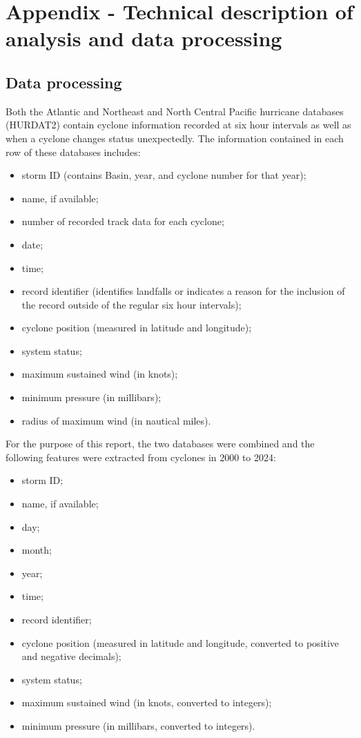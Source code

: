 \documentclass[
]{article}
\providecommand{\tightlist}{%
  \setlength{\itemsep}{0pt}\setlength{\parskip}{0pt}}
\begin{document}
\newpage

\section{Appendix - Technical description of analysis and data processing}\label{appendix---technical-description-of-analysis-and-data-processing}

\subsection{Data processing}\label{data-processing}

Both the Atlantic and Northeast and North Central Pacific hurricane databases (HURDAT2) contain cyclone information recorded at six hour intervals as well as when a cyclone changes status unexpectedly. The information contained in each row of these databases includes:

\begin{itemize}
\tightlist
\item
  storm ID (contains Basin, year, and cyclone number for that year);
\item
  name, if available;
\item
  number of recorded track data for each cyclone;
\item
  date;
\item
  time;
\item
  record identifier (identifies landfalls or indicates a reason for the inclusion of the record outside of the regular six hour intervals);
\item
  cyclone position (measured in latitude and longitude);
\item
  system status;
\item
  maximum sustained wind (in knots);
\item
  minimum pressure (in millibars);
\item
  radius of maximum wind (in nautical miles).
\end{itemize}

For the purpose of this report, the two databases were combined and the following features were extracted from cyclones in 2000 to 2024:

\begin{itemize}
\tightlist
\item
  storm ID;
\item
  name, if available;
\item
  day;
\item
  month;
\item
  year;
\item
  time;
\item
  record identifier;
\item
  cyclone position (measured in latitude and longitude, converted to positive and negative decimals);
\item
  system status;
\item
  maximum sustained wind (in knots, converted to integers);
\item
  minimum pressure (in millibars, converted to integers).
\end{itemize}
\end{document}
